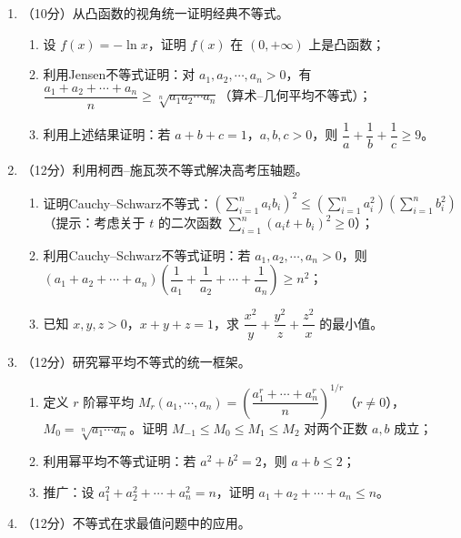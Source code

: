 \documentclass[12pt, a4paper]{ctexart}
\begin{document}
\begin{enumerate}[resume]

\item （10分）从凸函数的视角统一证明经典不等式。

\begin{enumerate}[label=(\arabic*)]
    \item 设 $f(x)=-\ln x$，证明 $f(x)$ 在 $(0,+\infty)$ 上是凸函数；
    \item 利用Jensen不等式证明：对 $a_1,a_2,\cdots,a_n>0$，有 $\dfrac{a_1+a_2+\cdots+a_n}{n}\geq \sqrt[n]{a_1a_2\cdots a_n}$（算术--几何平均不等式）；
    \item 利用上述结果证明：若 $a+b+c=1$，$a,b,c>0$，则 $\dfrac{1}{a}+\dfrac{1}{b}+\dfrac{1}{c}\geq 9$。
\end{enumerate}

\item （12分）利用柯西--施瓦茨不等式解决高考压轴题。

\begin{enumerate}[label=(\arabic*)]
    \item 证明Cauchy--Schwarz不等式：$\left(\displaystyle\sum_{i=1}^{n}a_ib_i\right)^2\leq \left(\displaystyle\sum_{i=1}^{n}a_i^2\right)\left(\displaystyle\sum_{i=1}^{n}b_i^2\right)$（提示：考虑关于 $t$ 的二次函数 $\displaystyle\sum_{i=1}^{n}(a_i t+b_i)^2\geq 0$）；
    \item 利用Cauchy--Schwarz不等式证明：若 $a_1,a_2,\cdots,a_n>0$，则 $(a_1+a_2+\cdots+a_n)\left(\dfrac{1}{a_1}+\dfrac{1}{a_2}+\cdots+\dfrac{1}{a_n}\right)\geq n^2$；
    \item 已知 $x,y,z>0$，$x+y+z=1$，求 $\dfrac{x^2}{y}+\dfrac{y^2}{z}+\dfrac{z^2}{x}$ 的最小值。
\end{enumerate}

\item （12分）研究幂平均不等式的统一框架。

\begin{enumerate}[label=(\arabic*)]
    \item 定义 $r$ 阶幂平均 $M_r(a_1,\cdots,a_n)=\left(\dfrac{a_1^r+\cdots+a_n^r}{n}\right)^{1/r}$（$r\neq 0$），$M_0=\sqrt[n]{a_1\cdots a_n}$。证明 $M_{-1}\leq M_0\leq M_1\leq M_2$ 对两个正数 $a,b$ 成立；
    \item 利用幂平均不等式证明：若 $a^2+b^2=2$，则 $a+b\leq 2$；
    \item 推广：设 $a_1^2+a_2^2+\cdots+a_n^2=n$，证明 $a_1+a_2+\cdots+a_n\leq n$。
\end{enumerate}

\item （12分）不等式在求最值问题中的应用。


\end{enumerate}
\end{document}
